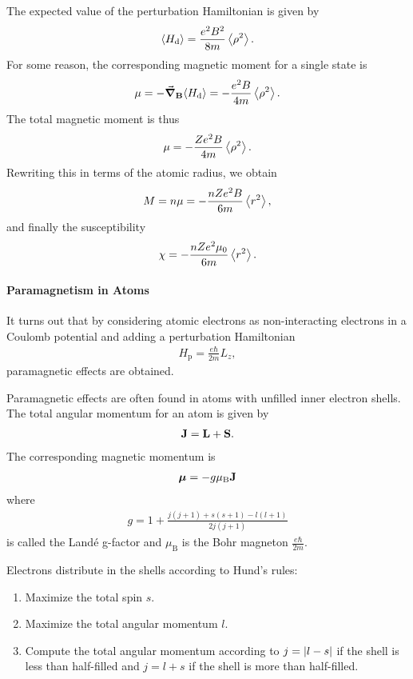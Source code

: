 The expected value of the perturbation Hamiltonian is given by
\begin{align*}
	\expval{H_{\text{d}}} = \frac{e^{2}B^{2}}{8m}\expval{\rho^{2}}.
\end{align*}
For some reason, the corresponding magnetic moment for a single state is
\begin{align*}
	\mu = -\grad_{\vb{B}}{\expval{H_{\text{d}}}} = -\frac{e^{2}B}{4m}\expval{\rho^{2}}.
\end{align*}
The total magnetic moment is thus
\begin{align*}
	\mu = -\frac{Ze^{2}B}{4m}\expval{\rho^{2}}.
\end{align*}
Rewriting this in terms of the atomic radius, we obtain
\begin{align*}
	M = n\mu = -\frac{nZe^{2}B}{6m}\expval{r^{2}},
\end{align*}
and finally the susceptibility
\begin{align*}
	\chi = -\frac{nZe^{2}\mu_{0}}{6m}\expval{r^{2}}.
\end{align*}

\paragraph{Paramagnetism in Atoms}
It turns out that by considering atomic electrons as non-interacting electrons in a Coulomb potential and adding a perturbation Hamiltonian
\begin{align*}
	H_{\text{p}} = \frac{e\hbar}{2m}L_{z},
\end{align*}
paramagnetic effects are obtained.

Paramagnetic effects are often found in atoms with unfilled inner electron shells. The total angular momentum for an atom is given by
\begin{align*}
	\vb{J} = \vb{L} + \vb{S}.
\end{align*}
The corresponding magnetic momentum is
\begin{align*}
	\vb*{\mu} = -g\mu_{\text{B}}\vb{J}
\end{align*}
where
\begin{align*}
	g = 1 + \frac{j(j + 1) + s(s + 1) - l(l + 1)}{2j(j + 1)}
\end{align*}
is called the Landé g-factor and $\mu_{\text{B}}$ is the Bohr magneton $\frac{e\hbar}{2m}$.

Electrons distribute in the shells according to Hund's rules:
\begin{enumerate}
	\item Maximize the total spin $s$.
	\item Maximize the total angular momentum $l$.
	\item Compute the total angular momentum according to $j = \abs{l - s}$ if the shell is less than half-filled and $j = l + s$ if the shell is more than half-filled.
\end{enumerate}

